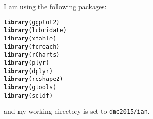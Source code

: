\documentclass[10pt]{report}
\makeatletter
\newcommand{\hlstd}[1]{\textcolor[rgb]{0.345,0.345,0.345}{#1}}%
\newcommand{\hlkwd}[1]{\textcolor[rgb]{0.737,0.353,0.396}{\textbf{#1}}}%
\newenvironment{kframe}{%
 \def\at@end@of@kframe{}%
 \ifinner\ifhmode%
  \def\at@end@of@kframe{\end{minipage}}%
  \begin{minipage}{\columnwidth}%
 \fi\fi%
 \def\FrameCommand##1{\hskip\@totalleftmargin \hskip-\fboxsep
 \colorbox{shadecolor}{##1}\hskip-\fboxsep
     \hskip-\linewidth \hskip-\@totalleftmargin \hskip\columnwidth}%
 \MakeFramed {\advance\hsize-\width
   \@totalleftmargin\z@ \linewidth\hsize
   \@setminipage}}%
 {\par\unskip\endMakeFramed%
 \at@end@of@kframe}
\newenvironment{knitrout}{}{} %
\makeatother
\begin{document}
%


\titleheader

I am using the following packages:
\begin{knitrout}
\color{fgcolor}\begin{kframe}
\begin{alltt}
\hlkwd{library}\hlstd{(ggplot2)}
\hlkwd{library}\hlstd{(lubridate)}
\hlkwd{library}\hlstd{(xtable)}
\hlkwd{library}\hlstd{(foreach)}
\hlkwd{library}\hlstd{(rCharts)}
\hlkwd{library}\hlstd{(plyr)}
\hlkwd{library}\hlstd{(dplyr)}
\hlkwd{library}\hlstd{(reshape2)}
\hlkwd{library}\hlstd{(gtools)}
\hlkwd{library}\hlstd{(sqldf)}
\end{alltt}
\end{kframe}
\end{knitrout}
and my working directory is set to \verb!dmc2015/ian!.
\end{document}
